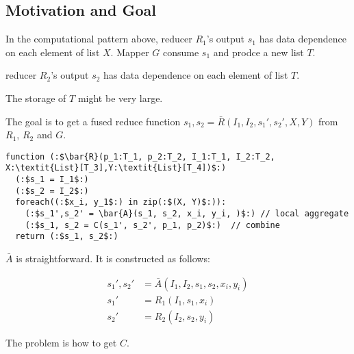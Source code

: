 
\subsection{Motivation and Goal}

In the computational pattern above, reducer $R_1$'s output $s_1$ has data dependence on each element of list $X$. Mapper $G$ consume $s_1$ and prodce a new list $T$.

reducer $R_2$'s output $s_2$ has data dependence on each element of list $T$.

The storage of $T$ might be very large.

The goal is to get a fused reduce function $s_1, s_2 = \bar{R}(I_1, I_2, s_1', s_2', X, Y)$ from $R_1$, $R_2$ and $G$.

\begin{lstlisting}[language=code_example, caption={}]
function (:$\bar{R}(p_1:T_1, p_2:T_2, I_1:T_1, I_2:T_2, X:\textit{List}[T_3],Y:\textit{List}[T_4])$:)
  (:$s_1 = I_1$:)
  (:$s_2 = I_2$:)
  foreach((:$x_i, y_1$:) in zip(:$(X, Y)$:)):
    (:$s_1',s_2' = \bar{A}(s_1, s_2, x_i, y_i, )$:) // local aggregate
    (:$s_1, s_2 = C(s_1', s_2', p_1, p_2)$:)  // combine
  return (:$s_1, s_2$:)
\end{lstlisting}

$\bar{A}$ is straightforward. It is constructed as follows:

\begin{align*}
  s_1', s_2' &= \bar{A}(I_1, I_2, s_1, s_2, x_i, y_i) \\
  s_1'&= R_1(I_1, s_1, x_i)  \\
  s_2' &= R_2(I_2, s_2, y_i)
\end{align*}

The problem is how to get $C$.
